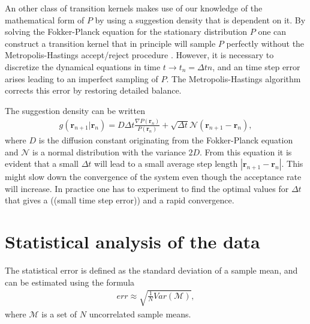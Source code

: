 \documentclass[a4paper,10pt,twocolumn]{article} %
\newcommand{\ts}[1]{\textbf{#1}}
\begin{document}
%

An other class of transition kernels makes use of our knowledge of the mathematical form of $P$ by using a suggestion density that is dependent on it. 
By solving the Fokker-Planck equation for the stationary distribution $P$ one can construct a transition kernel that in principle will sample $P$ perfectly without the 
Metropolis-Hastings accept/reject procedure \cite{lars_eivind_thesis, scemama_2006}. However, it is necessary to discretize the 
dynamical equations in time $t\to t_n= \Delta t n$, and an time step error arises leading to an imperfect sampling of $P$. %
The Metropolis-Hastings algorithm corrects this error %
by restoring detailed balance.%

The suggestion density can be written \cite{lars_eivind_thesis}
\begin{align}
	g(\ts r_{n+1}|\ts r_n)=D\Delta t \frac{\nabla P(\ts r_n)}{P(\ts r_n)} + \sqrt{\Delta t}\mathcal N(\ts r_{n+1}-\ts r_{n}),	
\end{align}
where $D$ is the diffusion constant originating from the Fokker-Planck equation and $\mathcal N$ is a normal distribution with the variance $2D$. 
From this equation it is evident that a small $\Delta t$ will lead to a small average step length $|\ts r_{n+1}-\ts r_n|$. This might slow down the 
convergence of the system even though the acceptance rate will increase. %
In practice one has to experiment to find the optimal values for $\Delta t$ that gives a ((small time step error)) and a rapid convergence. 




\section{Statistical analysis of the data}%

The statistical error is defined as the standard deviation of a sample mean, and can be estimated using the formula \cite{m.h-j}
\begin{align}
		err\approx\sqrt{\frac1{N}Var(\mathcal M)},
\end{align}
where $\mathcal M$ is a set of $N$ uncorrelated sample means.  
\end{document}
